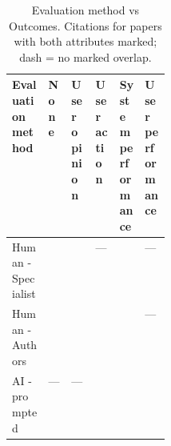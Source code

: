 \begin{table}[!htbp]
\centering
\small
\setlength{\tabcolsep}{4pt}
\renewcommand{\arraystretch}{1.3}
\caption{Evaluation method vs Outcomes. Citations for papers with both attributes marked; dash = no marked overlap.}
\begin{tabularx}{\linewidth}{|>{\raggedright\arraybackslash}p{0.23\linewidth}|>{\centering\arraybackslash}X|>{\centering\arraybackslash}X|>{\centering\arraybackslash}X|>{\centering\arraybackslash}X|>{\centering\arraybackslash}X|}
\hline
\textbf{Evaluation method} & \textbf{\hspace{0pt}None} & \textbf{\hspace{0pt}User opinion} & \textbf{\hspace{0pt}User action} & \textbf{\hspace{0pt}System performance} & \textbf{\hspace{0pt}User performance} \\ \hline
Human - Specialist & \cite{10.1145/3660650.3660656} & \cite{10.1145/3772318.3791233} & --- & \cite{10.1145/3703155} \cite{10.1145/3715275.3732039} \cite{10.1145/3772318.3791233} \cite{10.1145/3772318.3791300} & --- \\ \hline
Human - Authors & \cite{10.1145/3744169.3744194} \cite{10.1145/3776734.3794532} \cite{10.1145/3786304.3787879} & \cite{10.1145/3663547.3746319} & \cite{10.1145/3663547.3746319} & \cite{10.1109/SCW63240.2024.00017} \cite{10.1145/3746027.3755778} \cite{10.1145/3772363.3799334} \cite{10.1145/3786335.3813137} & --- \\ \hline
AI - prompted & --- & --- & \cite{10.1109/AIxVR67263.2026.00026} \cite{10.1145/3742413.3789120} & \cite{10.1109/BigData62323.2024.10825538} \cite{10.1109/ICASSP55912.2026.11460702} \cite{10.1109/SCW63240.2024.00017} \cite{10.1145/3715275.3732039} \cite{10.1145/3774904.3792506} \cite{10.1145/3788646.3789536} & \cite{10.1145/3742413.3789120} \\ \hline
\end{tabularx}
\end{table}
